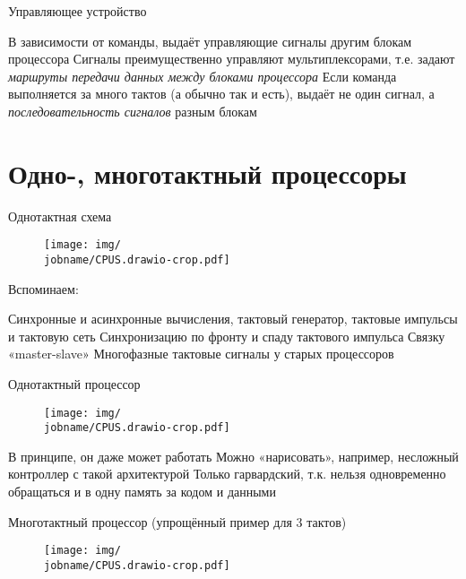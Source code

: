 \documentclass[xetex,aspectratio=43]{beamer}
\begin{document}
\begin{frame}{Управляющее устройство}
    \begin{outline}[itemize]
        \1 В зависимости от команды, выдаёт управляющие сигналы другим блокам процессора
            \2 Сигналы преимущественно управляют мультиплексорами, т.е. задают \emph{маршруты передачи данных между блоками процессора}
        \1 Если команда выполняется за много тактов (а обычно так и есть), выдаёт не один сигнал, а \emph{последовательность сигналов} разным блокам
    \end{outline}
\end{frame}

\section{Одно-, многотактный процессоры}

\begin{frame}{Однотактная схема}
    \begin{figure}
        \texttt{[image: img/\\jobname/CPUS.drawio-crop.pdf]}
    \end{figure}
    Вспоминаем:
    \begin{outline}[enumerate]
        \1 Синхронные и асинхронные вычисления, тактовый генератор, тактовые импульсы и тактовую сеть
        \1 Синхронизацию по фронту и спаду тактового импульса
        \1 Связку «master-slave»
        \1 Многофазные тактовые сигналы у старых процессоров
    \end{outline}
\end{frame}

\begin{frame}{Однотактный процессор}
    \begin{figure}
        \texttt{[image: img/\\jobname/CPUS.drawio-crop.pdf]}
    \end{figure}

    \begin{outline}[itemize]
        \1 В принципе, он даже может работать
            \2 Можно «нарисовать», например, несложный контроллер с такой архитектурой
        \1 Только гарвардский, т.к. нельзя одновременно обращаться и в одну память за кодом и данными
    \end{outline}
\end{frame}

\begin{frame}{Многотактный процессор (упрощённый пример для 3 тактов)}
    \begin{figure}
        \texttt{[image: img/\\jobname/CPUS.drawio-crop.pdf]}
    \end{figure}
\end{frame}
\end{document}
